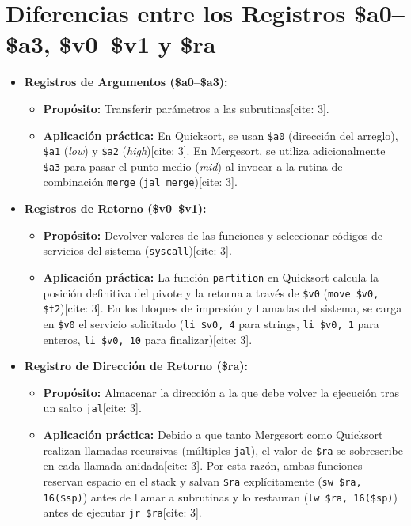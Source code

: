 \documentclass[12pt,a4paper]{article}
\begin{document}
\section{Diferencias entre los Registros \$a0--\$a3, \$v0--\$v1 y \$ra}

\begin{itemize}
    \item \textbf{Registros de Argumentos (\$a0--\$a3):}
    \begin{itemize}
        \item \textbf{Propósito:} Transferir parámetros a las subrutinas[cite: 3].
        \item \textbf{Aplicación práctica:} En Quicksort, se usan \texttt{\$a0} (dirección del arreglo), \texttt{\$a1} (\textit{low}) y \texttt{\$a2} (\textit{high})[cite: 3]. En Mergesort, se utiliza adicionalmente \texttt{\$a3} para pasar el punto medio (\textit{mid}) al invocar a la rutina de combinación \texttt{merge} (\texttt{jal merge})[cite: 3].
    \end{itemize}
    \item \textbf{Registros de Retorno (\$v0--\$v1):}
    \begin{itemize}
        \item \textbf{Propósito:} Devolver valores de las funciones y seleccionar códigos de servicios del sistema (\texttt{syscall})[cite: 3].
        \item \textbf{Aplicación práctica:} La función \texttt{partition} en Quicksort calcula la posición definitiva del pivote y la retorna a través de \texttt{\$v0} (\texttt{move \$v0, \$t2})[cite: 3]. En los bloques de impresión y llamadas del sistema, se carga en \texttt{\$v0} el servicio solicitado (\texttt{li \$v0, 4} para strings, \texttt{li \$v0, 1} para enteros, \texttt{li \$v0, 10} para finalizar)[cite: 3].
    \end{itemize}
    \item \textbf{Registro de Dirección de Retorno (\$ra):}
    \begin{itemize}
        \item \textbf{Propósito:} Almacenar la dirección a la que debe volver la ejecución tras un salto \texttt{jal}[cite: 3].
        \item \textbf{Aplicación práctica:} Debido a que tanto Mergesort como Quicksort realizan llamadas recursivas (múltiples \texttt{jal}), el valor de \texttt{\$ra} se sobrescribe en cada llamada anidada[cite: 3]. Por esta razón, ambas funciones reservan espacio en el stack y salvan \texttt{\$ra} explícitamente (\texttt{sw \$ra, 16(\$sp)}) antes de llamar a subrutinas y lo restauran (\texttt{lw \$ra, 16(\$sp)}) antes de ejecutar \texttt{jr \$ra}[cite: 3].
    \end{itemize}
\end{itemize}
\end{document}
